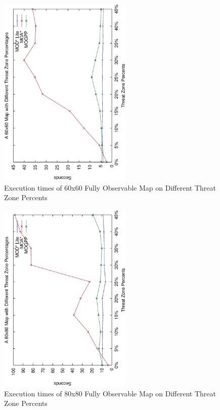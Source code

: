 \documentclass[10pt,journal]{IEEEtran}
\begin{document}
\begin{figure}
\centering
\includegraphics[width=2.5in, angle=270]{experimental/60x60_multiobj_normal}
\caption{Execution times of 60x60 Fully Observable Map on Different Threat Zone Percents}
\label{fig:tzratio60}
\end{figure}

\begin{figure}
\centering
\includegraphics[width=2.5in, angle=270]{experimental/80x80_multiobj_normal}
\caption{Execution times of 80x80 Fully Observable Map on Different Threat Zone Percents}
\label{fig:tzratio80}
\end{figure}

\end{document}
